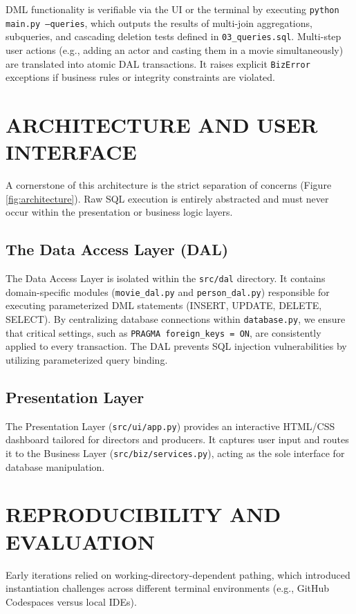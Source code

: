\documentclass[10pt,twocolumn,letterpaper]{article}
\begin{document}
DML functionality is verifiable via the UI or the terminal by executing \texttt{python main.py --queries}, which outputs the results of multi-join aggregations, subqueries, and cascading deletion tests defined in \texttt{03\_queries.sql}. Multi-step user actions (e.g., adding an actor and casting them in a movie simultaneously) are translated into atomic DAL transactions. It raises explicit \texttt{BizError} exceptions if business rules or integrity constraints are violated.

\section{ARCHITECTURE AND USER INTERFACE}
A cornerstone of this architecture is the strict separation of concerns (Figure \ref{fig:architecture}). Raw SQL execution is entirely abstracted and must never occur within the presentation or business logic layers. 

\subsection{The Data Access Layer (DAL)}
The Data Access Layer is isolated within the \texttt{src/dal} directory. It contains domain-specific modules (\texttt{movie\_dal.py} and \texttt{person\_dal.py}) responsible for executing parameterized DML statements (INSERT, UPDATE, DELETE, SELECT). 
By centralizing database connections within \texttt{database.py}, we ensure that critical settings, such as \texttt{PRAGMA foreign\_keys = ON}, are consistently applied to every transaction. The DAL prevents SQL injection vulnerabilities by utilizing parameterized query binding.

\subsection{Presentation Layer}
The Presentation Layer (\texttt{src/ui/app.py}) provides an interactive HTML/CSS dashboard tailored for directors and producers. It captures user input and routes it to the Business Layer (\texttt{src/biz/services.py}), acting as the sole interface for database manipulation.

\section{REPRODUCIBILITY AND EVALUATION}
Early iterations relied on working-directory-dependent pathing, which introduced instantiation challenges across different terminal environments (e.g., GitHub Codespaces versus local IDEs).
\end{document}
